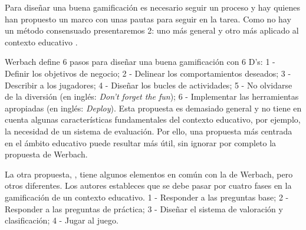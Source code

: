 Para diseñar una buena gamificación es necesario seguir un proceso y hay quienes han propuesto un marco con unas pautas para seguir en la tarea. 
%
Como no hay un método consensuado presentaremos 2: uno más general  \citep{werbach2012win} y otro más aplicado al contexto educativo  \citep*{kapp2013gamification}.

Werbach define 6 pasos para diseñar una buena gamificación con 6 D's: 
1 - Definir los objetivos de negocio; 2 - Delinear los comportamientos deseados; 3 - Describir a los jugadores; 4 - Diseñar los bucles de actividades; 5 - No olvidarse de la diversión (en inglés: \textit{Don't forget the fun}); 6 - Implementar las herramientas apropiadas (en inglés: \textit{Deploy}).
%
Esta propuesta es demasiado general y no tiene en cuenta algunas características fundamentales del contexto educativo, por ejemplo, la necesidad de un sistema de evaluación.
%
Por ello, una propuesta más centrada en el ámbito educativo puede resultar más útil, sin ignorar por completo la propuesta de Werbach.

La otra propuesta,  \cite{kapp2013gamification}, tiene algunos elementos en común con la de Werbach, pero otros diferentes. 
%
Los autores estableces que se debe pasar por cuatro fases en la gamificación de un contexto educativo. 1 - Responder a las preguntas base; 2 - Responder a las preguntas de práctica; 3 - Diseñar el sistema de valoración y clasificación; 4 - Jugar al juego.

